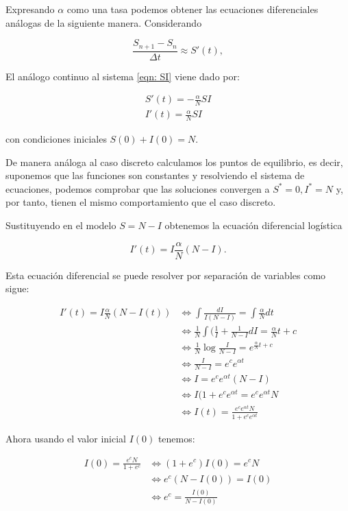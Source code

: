 Expresando $\alpha$ como una tasa podemos obtener las ecuaciones diferenciales análogas de la siguiente manera. Considerando

$$\frac{S_{n+1} - S_n}{\Delta t} \approx S'(t),$$

El análogo continuo al sistema \ref{eqn: SI} viene dado por:

\begin{equation}
\begin{aligned}
S'(t) = -\frac{\alpha}{N}SI \\
I'(t) = \frac{\alpha}{N}SI
\end{aligned}
\end{equation}

con condiciones iniciales $S(0)+I(0)=N$.

De manera análoga al caso discreto calculamos los puntos de equilibrio, es decir, suponemos que las funciones son constantes y resolviendo el sistema de ecuaciones, podemos comprobar que las soluciones convergen a $S^*=0, I^*=N$ y, por tanto, tienen el mismo comportamiento que el caso discreto.

Sustituyendo en el modelo $S=N-I$ obtenemos la ecuación diferencial logística

$$I'(t) = I\frac{\alpha}{N}(N-I).$$

Esta ecuación diferencial se puede resolver por separación de variables como sigue:

\begin{equation}
\begin{aligned}
I'(t)=I\frac{\alpha}{N}(N-I(t)) & \Leftrightarrow \int \frac{dI}{I(N-I)} = \int \frac{\alpha}{N} dt \\
& \Leftrightarrow \frac{1}{N}\int (\frac{1}{I}+\frac{1}{N-I}dI = \frac{\alpha}{N}t+c \\
& \Leftrightarrow  \frac{1}{N}\log{\frac{I}{N-I}} = e^{\frac{\alpha}{N}t+c} \\
& \Leftrightarrow  \frac{I}{N-I} = e^ce^{\alpha t} \\
& \Leftrightarrow  I = e^ce^{\alpha t}(N-I) \\
& \Leftrightarrow  I(1+e^ce^{\alpha t} = e^ce^{\alpha t}N \\
& \Leftrightarrow  I(t) = \frac{e^ce^{\alpha t}N}{1+e^ce^{\alpha t} }
\end{aligned}
\end{equation}

Ahora usando el valor inicial $I(0)$ tenemos:

\begin{equation}
\begin{aligned}
I(0) = \frac{e^cN}{1+e^c} & \Leftrightarrow (1+e^c)I(0) = e^cN \\
& \Leftrightarrow e^c(N-I(0)) = I(0) \\
& \Leftrightarrow e^c = \frac{I(0)}{N-I(0)}
\end {aligned}
\end{equation}

